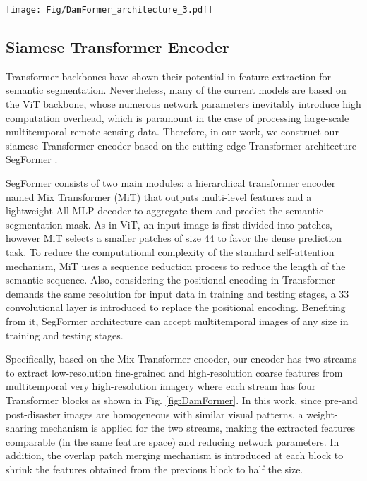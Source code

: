 \documentclass{article}
\begin{document}
\begin{figure*}[ht]

  \centering
  \texttt{[image: Fig/DamFormer\_architecture\_3.pdf]}
  \caption{Overview of the proposed DamFormer architecture. }
  \label{fig:DamFormer}
\end{figure*}

\subsection{Siamese Transformer Encoder}\label{sec:2.1}
\par Transformer backbones have shown their potential in feature extraction for semantic segmentation. Nevertheless, many of the current models are based on the ViT backbone, whose numerous network parameters inevitably introduce high computation overhead, which is paramount in the case of processing large-scale multitemporal remote sensing data. Therefore, in our work, we construct our siamese Transformer encoder based on the cutting-edge Transformer architecture SegFormer \cite{xie2021segformer}.

\par SegFormer consists of two main modules: a hierarchical transformer encoder named Mix Transformer (MiT) that outputs multi-level features and a lightweight All-MLP decoder to aggregate them and predict the semantic segmentation mask. As in ViT, an input image is first divided into patches, however MiT selects a smaller patches of size  44 to favor the dense prediction task.  To reduce the computational complexity of the standard self-attention mechanism, MiT uses a sequence reduction process to reduce the length of the semantic sequence. Also, considering the positional encoding in Transformer demands the same resolution for input data in training and testing stages, a 33 convolutional layer is introduced to replace the positional encoding. Benefiting from it, SegFormer architecture can accept multitemporal images of any size in training and testing stages. 

\par Specifically, based on the Mix Transformer encoder, our encoder has two streams to extract low-resolution fine-grained and high-resolution coarse features from multitemporal very high-resolution imagery where each stream has four Transformer blocks as shown in Fig. \ref{fig:DamFormer}. In this work, since pre-and post-disaster images are homogeneous with similar visual patterns, a weight-sharing mechanism is applied for the two streams, making the extracted features comparable (in the same feature space) and reducing network parameters. In addition, the overlap patch merging mechanism \cite{xie2021segformer} is introduced at each block to shrink the features obtained from the previous block to half the size. 
\end{document}
